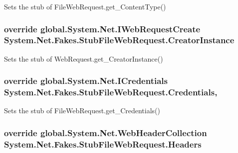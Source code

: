 Sets the stub of File\-Web\-Request.\-get\-\_\-\-Content\-Type()

\hypertarget{class_system_1_1_net_1_1_fakes_1_1_stub_file_web_request_adf40d6afafbe0890830bbf7edb3ef572}{
\subsubsection[{Creator\-Instance}]{\setlength{\rightskip}{0pt plus 5cm}override global.\-System.\-Net.\-I\-Web\-Request\-Create System.\-Net.\-Fakes.\-Stub\-File\-Web\-Request.\-Creator\-Instance\hspace{0.3cm}{\ttfamily [get]}}}\label{class_system_1_1_net_1_1_fakes_1_1_stub_file_web_request_adf40d6afafbe0890830bbf7edb3ef572}


Sets the stub of Web\-Request.\-get\-\_\-\-Creator\-Instance()

\hypertarget{class_system_1_1_net_1_1_fakes_1_1_stub_file_web_request_ae664d2650bd467b3d6d48be892d9295c}{
\subsubsection[{Credentials}]{\setlength{\rightskip}{0pt plus 5cm}override global.\-System.\-Net.\-I\-Credentials System.\-Net.\-Fakes.\-Stub\-File\-Web\-Request.\-Credentials\hspace{0.3cm}{\ttfamily [get]}, {\ttfamily [set]}}}\label{class_system_1_1_net_1_1_fakes_1_1_stub_file_web_request_ae664d2650bd467b3d6d48be892d9295c}


Sets the stub of File\-Web\-Request.\-get\-\_\-\-Credentials()

\hypertarget{class_system_1_1_net_1_1_fakes_1_1_stub_file_web_request_a2d615039463bb59a12b74eae6bfd3ca8}{
\subsubsection[{Headers}]{\setlength{\rightskip}{0pt plus 5cm}override global.\-System.\-Net.\-Web\-Header\-Collection System.\-Net.\-Fakes.\-Stub\-File\-Web\-Request.\-Headers\hspace{0.3cm}{\ttfamily [get]}}}\label{class_system_1_1_net_1_1_fakes_1_1_stub_file_web_request_a2d615039463bb59a12b74eae6bfd3ca8}



